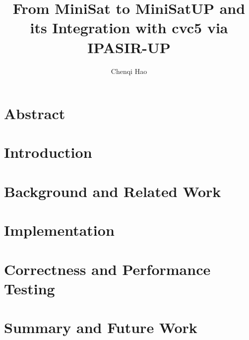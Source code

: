 \documentclass{scrbook}
\title{From MiniSat to MiniSatUP and its Integration with cvc5 via IPASIR-UP}
\author{Chenqi Hao}
\begin{document}
\maketitle



\chapter*{Abstract}

\tableofcontents

\chapter{Introduction}

\chapter{Background and Related Work}

\chapter{Implementation}

\chapter{Correctness and Performance Testing}

\chapter{Summary and Future Work}
\end{document}

